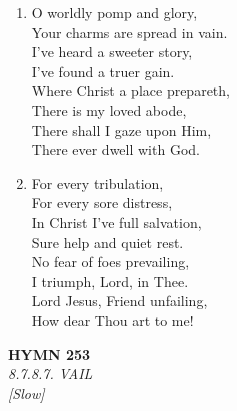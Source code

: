 \documentclass[11pt,a4paper]{article}
\begin{document}
\begin{enumerate}
    \item O worldly pomp and glory, \\
            Your charms are spread in vain. \\
        I've heard a sweeter story, \\
            I've found a truer gain. \\
        Where Christ a place prepareth, \\
            There is my loved abode, \\
        There shall I gaze upon Him, \\
            There ever dwell with God.

    \item For every tribulation, \\
            For every sore distress, \\
        In Christ I've full salvation, \\
            Sure help and quiet rest. \\
        No fear of foes prevailing, \\
            I triumph, Lord, in Thee. \\
        Lord Jesus, Friend unfailing, \\
            How dear Thou art to me!

\end{enumerate}

\newpage
\begin{center}
    {\Large \textbf{HYMN 253}}
    \\
    \textit{8.7.8.7. VAIL}
    \\
    \textit{\small [Slow]}
\end{center}
\vspace{1em}
\end{document}
